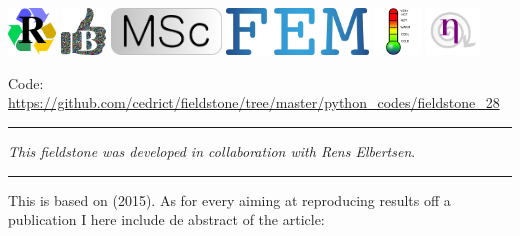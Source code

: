 \includegraphics[height=1.25cm]{images/pictograms/replication}
\includegraphics[height=1.25cm]{images/pictograms/benchmark}
\includegraphics[height=1.25cm]{images/pictograms/msc}
\includegraphics[height=1.25cm]{images/pictograms/FEM}
\includegraphics[height=1.25cm]{images/pictograms/temperature}
\includegraphics[height=1.25cm]{images/pictograms/nonlinear}




\begin{center}
\inpython
{\small Code: \url{https://github.com/cedrict/fieldstone/tree/master/python_codes/fieldstone_28}}
\end{center}

\par\noindent\rule{\textwidth}{0.4pt}

{\sl This fieldstone was developed in collaboration with Rens Elbertsen}. 

\par\noindent\rule{\textwidth}{0.4pt}

This \stone is based on \textcite{tosn15} (2015).
As for every \stone aiming at reproducing results off a publication I here include de abstract
of the article:

